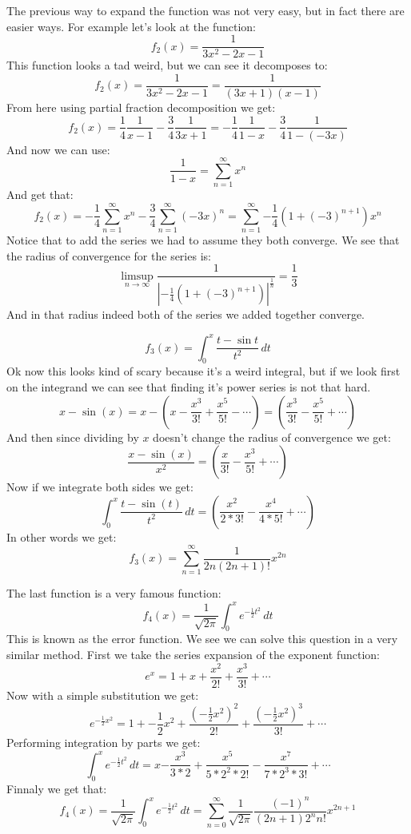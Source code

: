 \documentclass{article}
\theoremstyle{plain}
\begin{document}
	\newpage
	
	The previous way to expand the function was not very easy, but in fact
	there are easier ways. For example let's look at the function:
	\[
		f_2(x) = \frac{1}{3x^2-2x-1}
	\]
	This function looks a tad weird, but we can see it decomposes to:
	\[
		f_2(x) = \frac{1}{3x^2-2x-1} = \frac{1}{(3x+1)(x-1)}
	\]
	From here using partial fraction decomposition we get:
	\[
		f_2(x) = \frac 14 \frac{1}{x-1} - \frac 34 \frac{1}{3x+1} =
		-\frac 14 \frac{1}{1-x} - \frac 34 \frac{1}{1-(-3x)}
	\]
	And now we can use:
	\[
		\frac{1}{1-x} = \sum_{n=1}^{\infty}{x^n}
	\]
	And get that:
	\[
		f_2(x) = 
		- \frac 14 \sum_{n=1}^{\infty}{x^n}
		- \frac 34 \sum_{n=1}^{\infty}{(-3x)^n} = 
		\sum_{n=1}^{\infty}{-\frac 14 (1+(-3)^{n+1}) x^n}
	\]
	Notice that to add the series we had to assume they both converge.
	We see that the radius of convergence for the series is:
	\[
		\limsup_{n\to\infty}
		{\frac{1}{\left|-\frac 14 (1+(-3)^{n+1})\right|^{\frac 1n}}} = 
		\frac 13
	\]
	And in that radius indeed both of the series we added together converge.
	
	\newpage
	
	\[
		f_3(x) = \int_{0}^{x}{\frac{t-\sin t}{t^2}\,dt}
	\]
	Ok now this looks kind of scary because it's a weird integral, but
	if we look first on the integrand we can see that finding it's
	power series is not that hard.
	\[
		x - \sin(x) = 
		x - \left(x - \frac{x^3}{3!} + \frac{x^5}{5!} - \cdots \right) = 
		\left(\frac{x^3}{3!} - \frac{x^5}{5!} + \cdots \right)
	\]
	And then since dividing by $x$ doesn't change the radius of convergence
	we get:
	\[
		\frac{x - \sin(x)}{x^2} = 
		\left(\frac{x}{3!} - \frac{x^3}{5!} + \cdots \right)
	\]
	Now if we integrate both sides we get:
	\[
		\int_{0}^{x}{\frac{t - \sin(t)}{t^2}\,dt} = 
		\left(\frac{x^2}{2*3!} - \frac{x^4}{4*5!} + \cdots \right)
	\]
	In other words we get:
	\[
		f_3(x) = \sum_{n=1}^{\infty}{\frac{1}{2n(2n+1)!}x^{2n}}
	\]
	
	\newpage
	
	The last function is a very famous function:
	\[
		f_4(x) = 
		\frac{1}{\sqrt{2\pi}}\int_{0}^{x}{e^{-\frac{1}{2}t^2}\,dt}
	\]
	This is known as the error function. We see we can solve this question
	in a very similar method. First we take the series expansion of the
	exponent function:
	\[
		e^x = 1 + x + \frac{x^2}{2!} + \frac{x^3}{3!} + \cdots
	\]
	Now with a simple substitution we get:
	\[
		e^{-\frac{1}{2}x^2} = 
		1 + {-\frac{1}{2}x^2} + \frac{(-\frac{1}{2}x^2)^2}{2!} + 
		\frac{(-\frac{1}{2}x^2)^3}{3!} + \cdots
	\]
	Performing integration by parts we get:
	\[
		\int_{0}^{x}{e^{-\frac{1}{2}t^2}\,dt} = 
		x
		{-\frac{x^3}{3*2}} + 
		\frac{x^5}{5*2^2*2!} - 
		\frac{x^7}{7*2^3*3!} + \cdots
	\]
	Finnaly we get that:
	\[
		f_4(x) = 
		\frac{1}{\sqrt{2\pi}}\int_{0}^{x}{e^{-\frac{1}{2}t^2}\,dt} = 
		\sum_{n=0}^{\infty}{
		\frac{1}{\sqrt{2\pi}}
		\frac{(-1)^n}{(2n+1) 2^n n!}x^{2n+1}}
	\]
	
\end{document}

